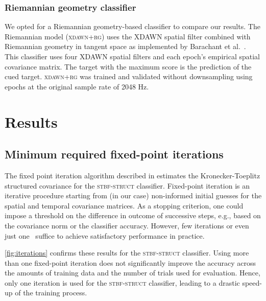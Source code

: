	\subsubsection{Riemannian geometry classifier}
	\label{sec:riemannian}
	We opted for a Riemannian
	geometry-based classifier to compare our results.
	The Riemannian model (\textsc{xdawn+rg}) uses the XDAWN spatial filter combined
	with Riemannian geometry in tangent space as implemented by Barachant et
	al.~\cite{Barachant2014a}.
	This classifier uses four XDAWN spatial filters and each epoch's empirical spatial covariance matrix.
	The target with the maximum score is the prediction of the cued target.
	\textsc{xdawn+rg} was trained and validated without downsampling using epochs
	at the original sample rate of 2048 Hz.

	\section{Results}
	\subsection{Minimum required fixed-point iterations}
	The fixed point iteration algorithm described
	in
  estimates the Kronecker-Toeplitz structured covariance for the
	\textsc{stbf-struct} classifier.
	Fixed-point iteration is an iterative procedure starting from (in our case)
	non-informed initial guesses for the spatial and temporal covariance matrices.
	As a stopping criterion, one could impose a threshold on the difference in
	outcome of successive steps, e.g., based on the covariance norm or the
	classifier accuracy.
	However, few iterations or even just one~\cite{Castaneda2014} suffice to achieve satisfactory performance in practice.

	\cref{fig:iterations} confirms these results for the \textsc{stbf-struct} classifier.
	Using more than one fixed-point iteration does not significantly improve the
	accuracy across the amounts of training data and the number of trials
  used for evaluation.
	Hence, only one iteration is used for the \textsc{stbf-struct} classifier, leading to a drastic speed-up of
  the  training process.

